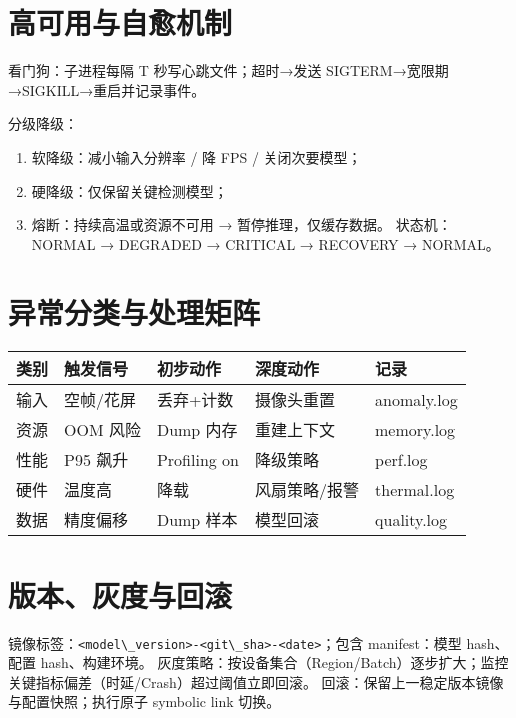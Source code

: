 \section{高可用与自愈机制}\label{ux9ad8ux53efux7528ux4e0eux81eaux6108ux673aux5236}

看门狗：子进程每隔 T 秒写心跳文件；超时→发送
SIGTERM→宽限期→SIGKILL→重启并记录事件。

分级降级：

\begin{enumerate}
\def\labelenumi{\arabic{enumi}.}
\tightlist
\item
  软降级：减小输入分辨率 / 降 FPS / 关闭次要模型；
\item
  硬降级：仅保留关键检测模型；
\item
  熔断：持续高温或资源不可用 → 暂停推理，仅缓存数据。 状态机：NORMAL →
  DEGRADED → CRITICAL → RECOVERY → NORMAL。
\end{enumerate}

\section{异常分类与处理矩阵}\label{ux5f02ux5e38ux5206ux7c7bux4e0eux5904ux7406ux77e9ux9635}

\begin{longtable}[]{@{}lllll@{}}
\toprule\noalign{}
类别 & 触发信号 & 初步动作 & 深度动作 & 记录 \\
\midrule\noalign{}
\endhead
\bottomrule\noalign{}
\endlastfoot
输入 & 空帧/花屏 & 丢弃+计数 & 摄像头重置 & anomaly.log \\
资源 & OOM 风险 & Dump 内存 & 重建上下文 & memory.log \\
性能 & P95 飙升 & Profiling on & 降级策略 & perf.log \\
硬件 & 温度高 & 降载 & 风扇策略/报警 & thermal.log \\
数据 & 精度偏移 & Dump 样本 & 模型回滚 & quality.log \\
\end{longtable}

\section{版本、灰度与回滚}\label{ux7248ux672cux7070ux5ea6ux4e0eux56deux6eda}

镜像标签：\passthrough{\lstinline!<model\_version>-<git\_sha>-<date>!}；包含
manifest：模型 hash、配置 hash、构建环境。
灰度策略：按设备集合（Region/Batch）逐步扩大；监控关键指标偏差（时延/Crash）超过阈值立即回滚。
回滚：保留上一稳定版本镜像与配置快照；执行原子 symbolic link 切换。

